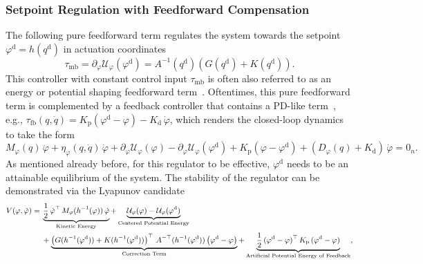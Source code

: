 \subsubsection{Setpoint Regulation with Feedforward Compensation}
The following pure feedforward term regulates the system towards the setpoint $\varphi^\mathrm{d} = h(q^\mathrm{d})$ in actuation coordinates~\citep{kelly1994pd, borja2022energy, della2023model, pustina2025analysis}
\begin{equation}\label{eq:background:model_based_control:fully_actuated:potential_shaping_regulation}
    \tau_\mathrm{mb} = \partial_{\varphi} \mathcal{U}_\varphi(\varphi^\mathrm{d})  = A^{-1}(q^\mathrm{d}) \left ( G(q^\mathrm{d}) + K(q^\mathrm{d}) \right ).
\end{equation}
This controller with constant control input $\tau_\mathrm{mb}$ is often also referred to as an energy or potential shaping feedforward term~\citep{borja2022energy}.
Oftentimes, this pure feedforward term is complemented by a feedback controller that contains a PD-like term~\citep{della2023model}, e.g., $\tau_\mathrm{fb}(q,\dot{q}) = K_\mathrm{p} \left ( \varphi^\mathrm{d} - \varphi \right ) - K_\mathrm{d} \, \dot{\varphi}$, which renders the closed-loop dynamics to take the form
\begin{equation}
    M_\varphi(q) \, \ddot{\varphi} + \eta_\varphi(q,\dot{q}) \, \dot{\varphi} + \partial_{\varphi} \mathcal{U}_\varphi(\varphi) - \partial_{\varphi} \mathcal{U}_\varphi(\varphi^\mathrm{d}) + K_\mathrm{p}  \left ( \varphi - \varphi^\mathrm{d} \right ) + \left ( D_\varphi(q) + K_\mathrm{d} \right ) \, \dot{\varphi} = 0_n.
\end{equation}
As mentioned already before, for this regulator to be effective, $\varphi^\mathrm{d}$ needs to be an attainable equilibrium of the system.
The stability of the regulator can be demonstrated via the Lyapunov candidate~\citep{della2023model}
\begin{equation}\small
\begin{split}
    V(\varphi, \dot{\varphi}) =& \: \underbrace{\frac{1}{2} \, \dot{\varphi}^\top \, M_\varphi(h^{-1}(\varphi)) \, \dot{\varphi}}_\text{Kinetic Energy} + \underbrace{\mathcal{U}_{\varphi}(\varphi) - \mathcal{U}_{\varphi}(\varphi^\mathrm{d})}_\text{Centered Potential Energy}\\
    & \: + \underbrace{\left (G(h^{-1}(\varphi^\mathrm{d})) + K(h^{-1}(\varphi^\mathrm{d})) \right )^\top \, A^{-\top}(h^{-1}(\varphi^\mathrm{d})) \left ( \varphi^\mathrm{d} - \varphi \right )}_\text{Correction Term} + \underbrace{\frac{1}{2} \, (\varphi^\mathrm{d} - \varphi)^\top \, K_\mathrm{p} \, (\varphi^\mathrm{d} - \varphi)}_\text{Artificial Potential Energy of Feedback},
\end{split}
\end{equation}
